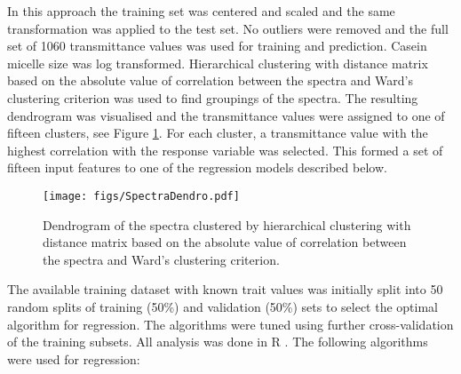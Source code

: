 

In this approach the training set was centered and scaled and the same transformation was applied to the test set. 
No outliers were removed and the full set of 1060 transmittance values was used for training and prediction. Casein micelle size was log transformed. Hierarchical clustering with distance matrix based on the absolute value of correlation between the spectra and Ward's clustering criterion was used to find groupings of the spectra. The resulting dendrogram was visualised and the transmittance values were assigned to one of fifteen clusters, see Figure \ref{fig:spectradendro}. For each cluster, a transmittance value with the highest correlation with the response variable was selected.  This formed a set of fifteen input features to one of the regression models described below. 

\begin{figure}
    \centering
    \texttt{[image: figs/SpectraDendro.pdf]}
    \caption{Dendrogram of the spectra clustered by hierarchical clustering with distance matrix based on the absolute value of correlation between the spectra and Ward's clustering criterion.}
    \label{fig:spectradendro}
\end{figure}

The available training dataset with known trait values was initially split into 50 random splits of training (50\%) and validation (50\%) sets to select the optimal algorithm for regression. The algorithms were tuned using further cross-validation of the training subsets. 
All analysis was done in R \citep{R}. 
The following algorithms were used for regression:

